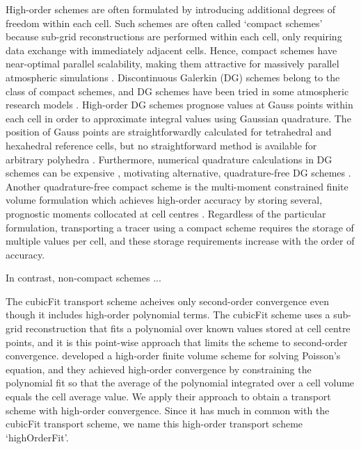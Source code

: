 High-order schemes are often formulated by introducing additional degrees of freedom within each cell.
Such schemes are often called `compact schemes' because sub-grid reconstructions are performed within each cell, only requiring data exchange with immediately adjacent cells.
Hence, compact schemes have near-optimal parallel scalability, making them attractive for massively parallel atmospheric simulations \citep{ullrich2014}.
Discontinuous Galerkin (DG) schemes belong to the class of compact schemes, and DG schemes have been tried in some atmospheric research models \citep{nair2005,giraldo-restelli2008}.
High-order DG schemes prognose values at Gauss points within each cell in order to approximate integral values using Gaussian quadrature.
The position of Gauss points are straightforwardly calculated for tetrahedral and hexahedral reference cells, but no straightforward method is available for arbitrary polyhedra \citep{costa2017}.
Furthermore, numerical quadrature calculations in DG schemes can be expensive \citep{dumbser2007}, motivating alternative, quadrature-free DG schemes \citep{atkins-shu1998,nair2015}.
Another quadrature-free compact scheme is the multi-moment constrained finite volume formulation which achieves high-order accuracy by storing several, prognostic moments collocated at cell centres \citep{ii-xiao2009}.
Regardless of the particular formulation, transporting a tracer using a compact scheme requires the storage of multiple values per cell, and these storage requirements increase with the order of accuracy.

In contrast, non-compact schemes ...




The cubicFit transport scheme acheives only second-order convergence even though it includes high-order polynomial terms.  The cubicFit scheme uses a sub-grid reconstruction that fits a polynomial over known values stored at cell centre points, and it is this point-wise approach that limits the scheme to second-order convergence.
\citet{devendran2017} developed a high-order finite volume scheme for solving Poisson’s equation, and they achieved high-order convergence by constraining the polynomial fit so that the average of the polynomial integrated over a cell volume equals the cell average value.
We apply their approach to obtain a transport scheme with high-order convergence.
Since it has much in common with the cubicFit transport scheme, we name this high-order transport scheme `highOrderFit'.


